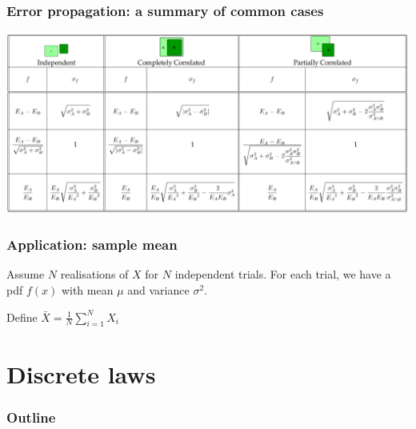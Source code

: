 \documentclass[9pt]{beamer}
\newif\ifmynote
\newcommand\mynote[1]{%
\ifmynote \textbf{#1} \else \fi
}
\begin{document}
\begin{frame}
 \frametitle{Error propagation: a summary of common cases}
 
 \mynote{Écrire au tableau... seulement Independent et Fully correlated, et seulement 1st et last line}
 
 \includegraphics[width=1.1\textwidth]{propagation_errors_table.png}
\end{frame}


\begin{frame}
 \frametitle{Application: sample mean}
 
 \mynote{Écrire au tableau}
 
  Assume $N$ realisations of $X$ for $N$ independent trials. For each trial, we have a pdf $f(x)$ with mean $\mu$ and variance $\sigma^2$. 
  
  Define $\bar{X} = \frac{1}{N} \sum_{i=1}^{N} X_i$
  

\end{frame}

\section{Discrete laws}

\begin{frame}
 \frametitle{Outline}
 
 \tableofcontents[current]
\end{frame}
\end{document}
